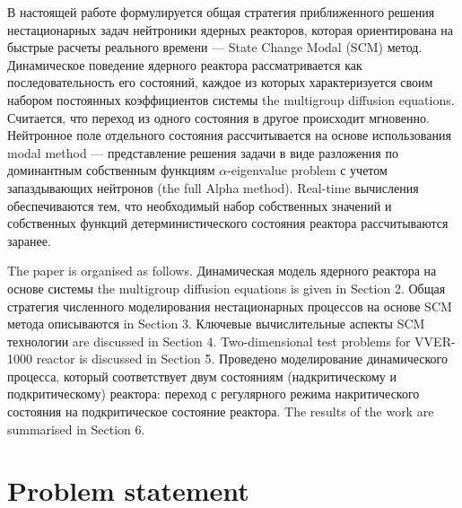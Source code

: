 \documentclass[authoryear]{elsarticle}
\begin{document}
В настоящей работе формулируется общая стратегия приближенного решения нестационарных задач нейтроники ядерных реакторов,
которая ориентирована на быстрые расчеты реального времени --- State Change Modal (SCM) метод.
Динамическое поведение ядерного реактора рассматривается как последовательность его состояний, каждое из которых
характеризуется своим набором постоянных коэффициентов системы  the multigroup diffusion equations.
Считается, что переход из одного состояния в другое происходит мгновенно.
Нейтронное поле отдельного состояния рассчитывается на основе использования modal method ---
представление решения задачи в виде разложения по доминантным собственным функциям $\alpha$-eigenvalue problem
с учетом запаздывающих нейтронов (the full Alpha method). 
Real-time вычисления обеспечиваются тем, что необходимый набор собственных значений и собственных функций
детерминистического состояния реактора рассчитываются заранее.

The paper is organised as follows. 
Динамическая модель ядерного реактора на основе системы the multigroup diffusion equations is given in Section 2. 
Общая стратегия численного  моделирования нестационарных процессов на основе SCM метода 
описываются in Section 3. 
Ключевые  вычислительные  аспекты SCM технологии are discussed in Section 4.
Two-dimensional test problems  for VVER-1000 reactor is discussed in Section 5. 
Проведено моделирование динамического процесса, который соответствует 
двум состояниям (надкритическому и подкритическому) реактора: переход с регулярного режима накритического состояния 
на подкритическое состояние реактора.
The results of the work are summarised in Section 6.

\section{Problem statement}
\end{document}
